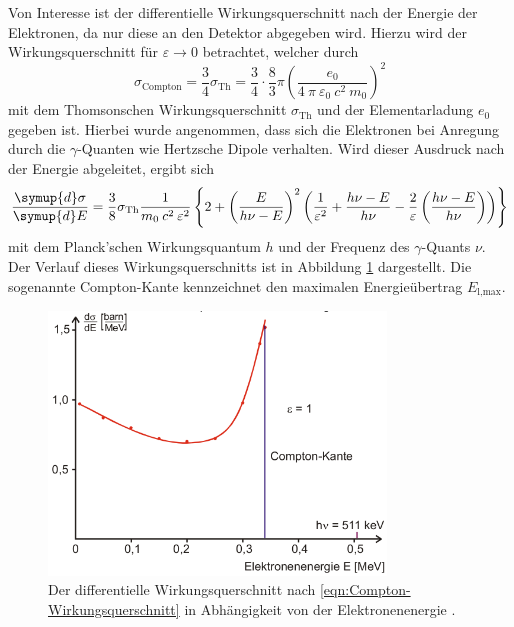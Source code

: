 Von Interesse ist der differentielle Wirkungsquerschnitt nach der Energie der
Elektronen, da nur diese an den Detektor abgegeben wird. Hierzu
wird der Wirkungsquerschnitt für $\varepsilon \rightarrow 0$ betrachtet,
welcher durch
\begin{equation*}
	\sigma_\text{Compton} = \frac{3}{4} \sigma_\text{Th}
	= \frac{3}{4} \cdot \frac{8}{3} \pi
	\left(\frac{e_0}{4\:\pi\:\varepsilon_0\:c^2\:m_0}\right)^2
\end{equation*}
mit dem Thomsonschen Wirkungsquerschnitt $\sigma_\text{Th}$ und der Elementarladung $e_0$ gegeben ist.
Hierbei wurde angenommen, dass sich die Elektronen bei Anregung durch die
$\gamma$-Quanten wie Hertzsche Dipole verhalten.
Wird dieser Ausdruck nach der Energie abgeleitet, ergibt sich
\begin{equation}
	\frac{\symup{d}\sigma}{\symup{d}E} =
	\frac{3}{8} \sigma_\text{Th} \frac{1}{m_0\:c^2\:\varepsilon^2}
	\left\{2 + \left(\frac{E}{h \nu - E}\right)^2
	\left(\frac{1}{\varepsilon^2} + \frac{h \nu - E}{h \nu} - \frac{2}{\varepsilon}
	\left(\frac{h \nu - E}{h \nu}\right)\right)\right\}
	\label{eqn:Compton-Wirkungsquerschnitt}
\end{equation}
mit dem Planck'schen Wirkungsquantum $h$ und der Frequenz des $\gamma$-Quants $\nu$.
Der Verlauf dieses Wirkungsquerschnitts ist in Abbildung \ref{fig:Compton-Wirkungsquerschnitt}
dargestellt. Die sogenannte Compton-Kante kennzeichnet den maximalen Energieübertrag
$E_\text{l,max}$.

\begin{figure}
	\centering
	\includegraphics[height=7.0cm]{images/Compton-Wirkungsquerschnitt.pdf}
	\caption{Der differentielle Wirkungsquerschnitt nach \eqref{eqn:Compton-Wirkungsquerschnitt}
	in Abhängigkeit von der Elektronenenergie \cite[7]{anleitung}.}
	\label{fig:Compton-Wirkungsquerschnitt}
\end{figure}

